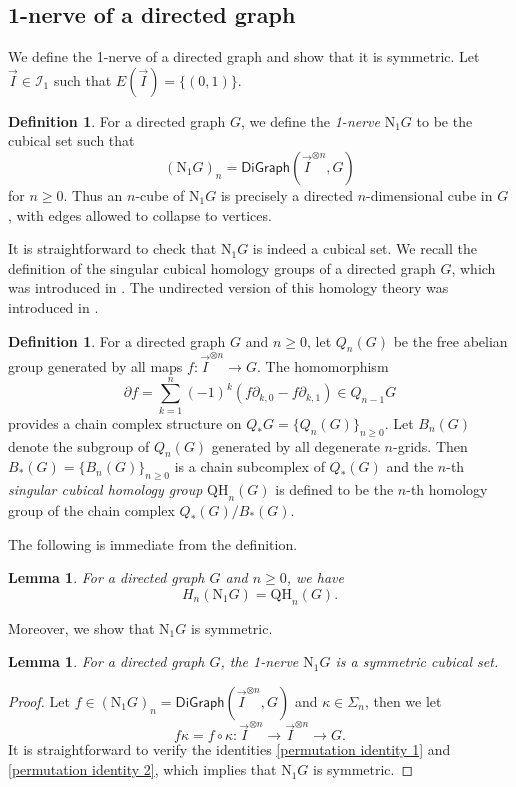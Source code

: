 \documentclass[oneside, 12pt]{amsart}
\numberwithin{equation}{section}
\theoremstyle{plain}
\newtheorem{lemma}[theorem]{Lemma}
\theoremstyle{definition}
\newtheorem{definition}[theorem]{Definition}
\theoremstyle{remark}
\begin{document}
	\subsection{1-nerve of a directed graph}
	We define the 1-nerve of a directed graph and show that it is symmetric. Let $\vec{I}\in\mathcal{I}_1$ such that $E(\vec{I})=\{(0,1)\}$.
	\begin{definition}
		\label{1-nerve}
		For a directed graph $G$, we define the \emph{1-nerve} $\mathrm{N}_1G$ to be the cubical set such that
		\[
		(\mathrm{N}_1G)_n=\mathsf{DiGraph}(\vec{I}^{\otimes n},G)
		\]
		for $n\ge0$. Thus an $n$-cube of $\mathrm{N}_1G$ is precisely a directed $n$-dimensional cube in $G$, with edges allowed to collapse to vertices. %
	\end{definition}
	It is straightforward to check that $\mathrm{N}_1G$ is indeed a cubical set. We recall the definition of the singular cubical homology groups of a directed graph $G$, which was introduced in \cite{GM2}. The undirected version of this homology theory was introduced in \cite{CK2}.
	\begin{definition}
		For a directed graph $G$ and $n\ge0$, let $Q_n(G)$ be the free abelian group generated by all maps $f\colon\vec{I}^{\otimes n}\to G$. The homomorphism
		\[
		\partial f=\sum_{k=1}^n(-1)^k(f\partial_{k,0}-f\partial_{k,1})\in Q_{n-1}G
		\]
		provides a chain complex structure on $Q_*G=\{Q_n(G)\}_{n\ge0}$. Let $B_n(G)$ denote the subgroup of $Q_n(G)$ generated by all degenerate $n$-grids. Then $B_*(G)=\{B_n(G)\}_{n\ge0}$ is a chain subcomplex of $Q_*(G)$ and the $n$-th \emph{singular cubical homology group} $\mathrm{QH}_n(G)$ is defined to be the $n$-th homology group of the chain complex $Q_*(G)/B_*(G)$.
	\end{definition}
	The following is immediate from the definition.
	\begin{lemma}
		\label{two homology groups}
		For a directed graph $G$ and $n\ge0$, we have
		\[
		H_n(\mathrm{N}_1G)=\mathrm{QH}_n(G).
		\]
	\end{lemma} 
	Moreover, we show that $\mathrm{N}_1G$ is symmetric.
	\begin{lemma}
		\label{1-nerve symmetric}
		For a directed graph $G$, the 1-nerve $\mathrm{N}_1G$ is a symmetric cubical set.
	\end{lemma}
	\begin{proof}
		Let $f\in(\mathrm{N}_1G)_n=\mathsf{DiGraph}(\vec{I}^{\otimes n},G)$ and $\kappa\in\Sigma_n$, then we let
		\[
		f\kappa=f\circ\kappa\colon\vec{I}^{\otimes n}\to\vec{I}^{\otimes n}\to G.
		\]
		It is straightforward to verify the identities \eqref{permutation identity 1} and \eqref{permutation identity 2}, which implies that $\mathrm{N}_1G$ is symmetric.
	\end{proof}
\end{document}
